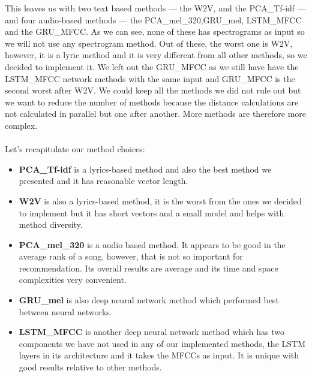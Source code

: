 This leaves us with two text based methods --- the W2V, and the PCA\_Tf-idf --- and four audio-based methods --- the PCA\_mel\_320,GRU\_mel, LSTM\_MFCC and the GRU\_MFCC. As we can see, none of these has spectrograms as input so we will not use any spectrogram method. Out of these, the worst one is W2V, however, it is a lyric method and it is very different from all other methods, so we decided to implement it. We left out the GRU\_MFCC as we still have have the LSTM\_MFCC network methods with the same input and GRU\_MFCC is the second worst after W2V. We could keep all the methods we did not rule out but we want to reduce the number of methods because the distance calculations are not calculated in parallel but one after another. More methods are therefore more complex. \\ \\
Let's recapitulate our method choices:
\begin{itemize}
    \item \textbf{PCA\_Tf-idf} is a lyrics-based method and also the best method we presented and it has reasonable vector length.
    \item \textbf{W2V} is also a lyrics-based method, it is the worst from the ones we decided to implement but it has short vectors and a small model and helps with method diversity.
    \item \textbf{PCA\_mel\_320} is a audio based method. It appears to be good in the average rank of a song, however, that is not so important for recommendation. Its overall results are average and its time and space complexities very convenient.
    \item \textbf{GRU\_mel} is also deep neural network method which performed best between neural networks.
    \item \textbf{LSTM\_MFCC} is another deep neural network method which has two components we have not used in any of our implemented methods, the LSTM layers in its architecture and it takes the MFCCs as input. It is unique with good results relative to other methods. 
\end{itemize}

